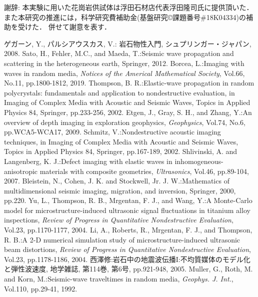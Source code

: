 \documentclass{jsce}
\begin{document}
{\gt 謝辞:}
本実験に用いた花崗岩供試体は浮田石材店代表浮田隆司氏に提供頂いた．
また本研究の推進には，科学研究費補助金(基盤研究©課題番号\#18K04334)の補助を受けた．
併せて謝意を表す．
\begin{thebibliography}{99}
\begin{spacing}{1.175}
	ゲガーン, Y., パルシアウスカス, V.: 
	岩石物性入門, シュプリンガー・ジャパン, 2008. 
	Sato, H., Fehler, M.C., and Maeda, T.:Seismic wave propagation and scattering in the heterogeneous earth, 
	Springer, 2012.
	Borcea, L.:Imaging with waves in random media, {\it Notices of the Americal Mathematical Society}, Vol.66, No.11, 
	pp.1800-1812, 2019.
	Thompson, B. R.:Elastic-wave propagation in random polycrystals: 
	fundamentals and application to nondestructive evaluation, 
	in Imaging of Complex Media with Acoustic and Seismic Waves, Topics in Applied Physics 84, Springer, pp.233-256, 2002.
	Etgen, J., Gray, S. H., and Zhang, Y.:An overview of depth imaging in exploration geophysics, 
	{\it Geophysics}, Vol.74, No.6, pp.WCA5-WCA17, 2009.
	Schmitz, V.:Nondestructive acoustic imaging techniques, in Imaging of Complex Media with Acoustic and Seismic Waves, 
	Topics in Applied Physics 84, Springer, pp.167-189, 2002.
	Shlivinski, A. and Langenberg, K. J.:Defect imaging with elastic waves in inhomogeneous-anisotropic materials with composite geometries, {\it Ultrasonics}, Vol.46, pp.89-104, 2007.
	Bleistein, N., Cohen, J. K. and Stockwell, Jr. J. W.:Mathematics of multidimensional seismic imaging, migration, and inversion, Springer, 2000, pp.220.
	Yu, L., Thompson, R. B., Mrgentan, F. J., and Wang, Y.:A Monte-Carlo model for microstructure-induced ultrasonic signal fluctuations in titanium alloy inspections,
	{\it Review of Progress in Quantitative Nondestructive Evaluation}, Vol.23, pp.1170-1177, 2004.
	Li, A., Roberts, R., Mrgentan, F. J., and Thompson, R. B.:A 2-D numerical simulation study of microstructure-induced  ultrasonic beam distortions,
	{\it Review of Progress in Quantitative Nondestructive Evaluation}, Vol.23, pp.1178-1186, 2004.
	西澤修:岩石中の地震波伝播I:不均質媒体のモデル化と弾性波速度, 地学雑誌, 第114巻, 第6号,  pp.921-948,  2005.
	Muller, G., Roth, M. and Korn, M.:Seismic-wave traveltimes in random media,
	{\it Geophys. J. Int.}, Vol.110, pp.29-41, 1992. 

\end{spacing}
\end{thebibliography}
\end{document}
